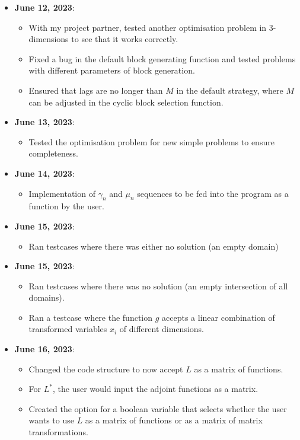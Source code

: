 \documentclass[a4paper,11pt,fleqn]{article}
\theoremstyle{plain}{\theorembodyfont{\rmfamily}%
\newtheorem{conjecture}[theorem]{Conjecture}}
\theoremstyle{plain}{\theorembodyfont{\rmfamily}%
\newtheorem{example}[theorem]{Example}}
\theoremstyle{plain}{\theorembodyfont{\rmfamily}%
\newtheorem{remark}[theorem]{Remark}}
\theoremstyle{plain}{\theorembodyfont{\rmfamily}%
\newtheorem{algorithm}[theorem]{Algorithm}}
\theoremstyle{plain}{\theorembodyfont{\rmfamily}%
\newtheorem{condition}[theorem]{Condition}}
\theoremstyle{plain}{\theorembodyfont{\rmfamily}%
\newtheorem{definition}[theorem]{Definition}}
\theoremstyle{plain}{\theorembodyfont{\rmfamily}
\newtheorem{fact}[theorem]{Fact}}
\theoremstyle{plain}{\theorembodyfont{\rmfamily}
\newtheorem{problem}[theorem]{Problem}}
\theoremstyle{plain}{\theorembodyfont{\rmfamily}
\newtheorem{notation}[theorem]{Notation}}
\theoremstyle{plain}{\theorembodyfont{\rmfamily}
\newtheorem{project}[theorem]{Project}}
\begin{document}
\begin{itemize}
\item {\bf June 12, 2023}:
\begin{itemize} 
\item With my project partner, tested another optimisation problem in 3-dimensions to see that it works correctly.
\item Fixed a bug in the default block generating function and tested problems with different parameters of block generation.
\item Ensured that lags are no longer than $M$ in the default strategy, where $M$ can be adjusted in the cyclic block selection function.
\end{itemize}

\item {\bf June 13, 2023}:
\begin{itemize} 
\item Tested the optimisation problem for new simple problems to ensure completeness.
\end{itemize}

\item {\bf June 14, 2023}:
\begin{itemize} 
\item Implementation of $\gamma_n$ and $\mu_n$ sequences to be fed into the program as a function by the user.
\end{itemize}

\item {\bf June 15, 2023}:
\begin{itemize} 
\item Ran testcases where there was either no solution (an empty domain)  
\end{itemize}

\item {\bf June 15, 2023}:
\begin{itemize} 
\item Ran testcases where there was no solution (an empty intersection of all domains).
\item Ran a testcase where the function $g$ accepts a linear combination of transformed variables $x_i$ of different dimensions.
\end{itemize}

\item {\bf June 16, 2023}:
\begin{itemize} 
\item Changed the code structure to now accept $L$ as a matrix of functions.
\item For $L^*$, the user would input the adjoint functions as a matrix. 
\item Created the option for a boolean variable that selects whether the user wants to use $L$ as a matrix of functions or as a matrix of matrix transformations.
\end{itemize}



\end{itemize}
\end{document}
